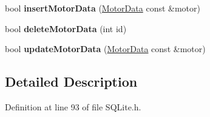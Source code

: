 \begin{DoxyCompactItemize}
\item 
\mbox{\label{class_s_q_lite_a38eb0f1501e0918c267a9ab3a0953a54}} 
bool {\bfseries insert\+Motor\+Data} (\hyperlink{class_motor_data}{Motor\+Data} const \&motor)
\item 
\mbox{\label{class_s_q_lite_ab1f59cd24e3931970bc39079b0a5e612}} 
bool {\bfseries delete\+Motor\+Data} (int id)
\item 
\mbox{\label{class_s_q_lite_a7909128eed1b0612ecdf7c50edf1426a}} 
bool {\bfseries update\+Motor\+Data} (\hyperlink{class_motor_data}{Motor\+Data} const \&motor)
\end{DoxyCompactItemize}


\subsection{Detailed Description}


Definition at line 93 of file S\+Q\+Lite.\+h.



